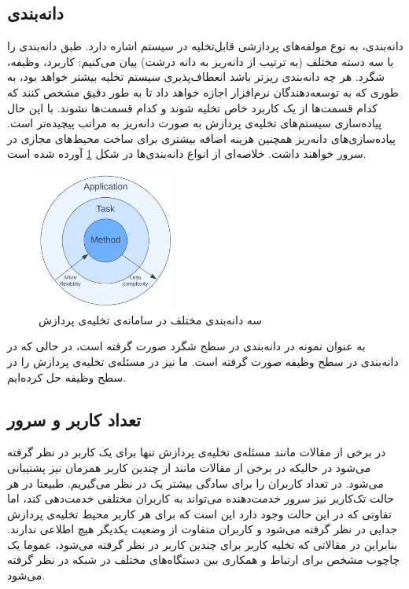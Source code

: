 \subsection{دانه‌بندی}
دانه‌بندی، به نوع مولفه‌های پردازشی قابل‌تخلیه در سیستم اشاره دارد. طبق \cite{wang2019} دانه‌بندی را با سه دسته مختلف (به ترتیب از دانه‌‌ریز به دانه ‌درشت) بیان می‌کنیم: کاربرد، وظیفه، شگرد. هر چه دانه‌بندی ریزتر باشد انعطاف‌پذیری سیستم تخلیه بیشتر خواهد بود، به طوری که به توسعه‌دهندگان نرم‌افزار اجازه خواهد داد تا به طور دقیق مشخص کنند که کدام قسمت‌ها از یک کاربرد خاص تخلیه شوند و کدام قسمت‌ها نشوند. با این حال پیاده‌سازی سیستم‌های تخلیه‌ی پردازش به صورت دانه‌ریز به مراتب پیچیده‌تر است. پیاده‌سازی‌های دانه‌ریز همچنین هزینه اضافه بیشتری برای ساخت محیط‌های مجازی در سرور خواهند داشت. خلاصه‌ای از انواع دانه‌بندی‌ها در شکل \ref{fig:granularity} آورده شده است.
\begin{figure}[H]
	\centering
	\includegraphics[width=0.4\textwidth]{figures/granularity.png}
	\caption{سه دانه‌بندی مختلف در سامانه‌ی تخلیه‌ی پردازش}
	\label{fig:granularity}
\end{figure}
به عنوان نمونه در \cite{maui} دانه‌بندی در سطح شگرد صورت گرفته است، در حالی که در \cite{Liu} دانه‌بندی در سطح وظیفه صورت گرفته است. ما نیز در \CurrentProject مسئله‌ی تخلیه‌ی پردازش را در سطح وظیفه حل کرده‌ایم.
\newpage
\subsection{تعداد کاربر و سرور}
در برخی از مقالات مانند \cite{Liu} مسئله‌ی تخلیه‌ی پردازش تنها برای یک کاربر در نظر گرفته می‌شود در حالیکه در برخی از مقالات مانند \cite{multiuser} از چندین کاربر همزمان نیز پشتیبانی می‌شود. در \CurrentProject تعداد کاربران را برای سادگی بیشتر یک در نظر می‌گیریم. طبیعتا در هر حالت تک‌کاربر نیز سرور خدمت‌دهنده می‌تواند به کاربران مختلفی خدمت‌دهی کند، اما تفاوتی که در این حالت وجود دارد این است که برای هر کاربر محیط تخلیه‌ی پردازش جدایی در نظر گرفته می‌شود و کاربران متفاوت از وضعیت یکدیگر هیچ اطلاعی ندارند. بنابراین در مقالاتی که تخلیه کاربر برای چندین کاربر در نظر گرفته می‌شود، عموما یک چاچوب مشخص برای ارتباط و همکاری بین دستگاه‌های مختلف در شبکه در نظر گرفته می‌شود. \\

